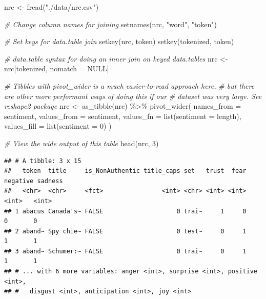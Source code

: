 \documentclass[
]{article}
\newenvironment{Shaded}{\begin{snugshade}}{\end{snugshade}}
\newcommand{\AttributeTok}[1]{\textcolor[rgb]{0.77,0.63,0.00}{#1}}
\newcommand{\CommentTok}[1]{\textcolor[rgb]{0.56,0.35,0.01}{\textit{#1}}}
\newcommand{\ConstantTok}[1]{\textcolor[rgb]{0.00,0.00,0.00}{#1}}
\newcommand{\DecValTok}[1]{\textcolor[rgb]{0.00,0.00,0.81}{#1}}
\newcommand{\FunctionTok}[1]{\textcolor[rgb]{0.00,0.00,0.00}{#1}}
\newcommand{\NormalTok}[1]{#1}
\newcommand{\OtherTok}[1]{\textcolor[rgb]{0.56,0.35,0.01}{#1}}
\newcommand{\SpecialCharTok}[1]{\textcolor[rgb]{0.00,0.00,0.00}{#1}}
\newcommand{\StringTok}[1]{\textcolor[rgb]{0.31,0.60,0.02}{#1}}
\begin{document}
\begin{Shaded}
\begin{Highlighting}[]
\NormalTok{nrc }\OtherTok{\textless{}{-}} \FunctionTok{fread}\NormalTok{(}\StringTok{"./data/nrc.csv"}\NormalTok{)}

\CommentTok{\# Change column names for joining}
\FunctionTok{setnames}\NormalTok{(nrc, }\StringTok{"word"}\NormalTok{, }\StringTok{"token"}\NormalTok{)}

\CommentTok{\# Set keys for data.table join}
\FunctionTok{setkey}\NormalTok{(nrc, token)}
\FunctionTok{setkey}\NormalTok{(tokenized, token)}

\CommentTok{\# data.table syntax for doing an inner join on keyed data.tables}
\NormalTok{nrc }\OtherTok{\textless{}{-}}\NormalTok{ nrc[tokenized, nomatch }\OtherTok{=} \ConstantTok{NULL}\NormalTok{]}

\CommentTok{\# Tibbles with pivot\_wider is a much easier{-}to{-}read approach here,}
\CommentTok{\# but there are other more performant ways of doing this if our}
\CommentTok{\# dataset was very large. See \textasciigrave{}reshape2\textasciigrave{} package}
\NormalTok{nrc }\OtherTok{\textless{}{-}} \FunctionTok{as\_tibble}\NormalTok{(nrc) }\SpecialCharTok{\%\textgreater{}\%}
  \FunctionTok{pivot\_wider}\NormalTok{(}
    \AttributeTok{names\_from =}\NormalTok{ sentiment,}
    \AttributeTok{values\_from =}\NormalTok{ sentiment,}
    \AttributeTok{values\_fn =} \FunctionTok{list}\NormalTok{(}\AttributeTok{sentiment =}\NormalTok{ length),}
    \AttributeTok{values\_fill =} \FunctionTok{list}\NormalTok{(}\AttributeTok{sentiment =} \DecValTok{0}\NormalTok{)}
\NormalTok{  )}

\CommentTok{\# View the wide output of this table}
\FunctionTok{head}\NormalTok{(nrc, }\DecValTok{3}\NormalTok{)}
\end{Highlighting}
\end{Shaded}

\begin{verbatim}
## # A tibble: 3 x 15
##   token  title     is_NonAuthentic title_caps set   trust  fear negative sadness
##   <chr>  <chr>     <fct>                <int> <chr> <int> <int>    <int>   <int>
## 1 abacus Canada's~ FALSE                    0 trai~     1     0        0       0
## 2 aband~ Spy chie~ FALSE                    0 test~     0     1        1       1
## 3 aband~ Schumer:~ FALSE                    0 trai~     0     1        1       1
## # ... with 6 more variables: anger <int>, surprise <int>, positive <int>,
## #   disgust <int>, anticipation <int>, joy <int>
\end{verbatim}
\end{document}
